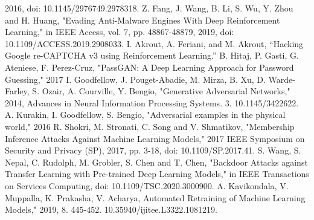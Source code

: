 \documentclass[11pt,conference]{IEEEtran}
\begin{document}
\begin{thebibliography}{00}
        2016, doi: 10.1145/2976749.2978318.
     Z. Fang, J. Wang, B. Li, S. Wu, Y. Zhou and H. Huang,
        "Evading Anti-Malware Engines With Deep Reinforcement Learning," in
        IEEE Access, vol. 7, pp. 48867-48879, 2019, doi:
        10.1109/ACCESS.2019.2908033.
     I. Akrout, A. Feriani, and M. Akrout, “Hacking  Google
        re-CAPTCHA v3 using Reinforcement Learning.”
     B. Hitaj, P. Gasti, G. Ateniese, F. Perez-Cruz, "PassGAN: A Deep Learning Approach for
        Password Guessing," 2017
     I. Goodfellow, J. Pouget-Abadie, M. Mirza, B. Xu, D.
        Warde-Farley, S. Ozair, A. Courville, Y. Bengio, "Generative
        Adversarial Networks," 2014, Advances in Neural
        Information Processing Systems. 3. 10.1145/3422622. 
     A. Kurakin, I. Goodfellow, S. Bengio, "Adversarial examples
        in the physical world," 2016
     R. Shokri, M. Stronati, C. Song and V. Shmatikov, "Membership
        Inference Attacks Against Machine Learning Models," 2017 IEEE Symposium
        on Security and Privacy (SP), 2017, pp. 3-18, doi: 10.1109/SP.2017.41.
     S. Wang, S. Nepal, C. Rudolph, M. Grobler, S. Chen and T.
        Chen, "Backdoor Attacks against Transfer Learning with Pre-trained Deep
        Learning Models," in IEEE Transactions on Services Computing, doi:
        10.1109/TSC.2020.3000900.
     A. Kavikondala, V. Muppalla, K. Prakasha, V. Acharya, Automated Retraining of Machine
        Learning Models," 2019, 8. 445-452. 10.35940/ijitee.L3322.1081219. 

\end{thebibliography}
\vspace{12pt}
\end{document}
